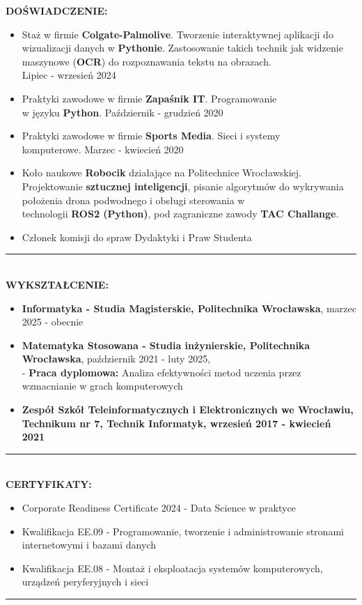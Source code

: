\documentclass[10pt]{article}
\begin{document}
\fontsize{14pt}{14pt}\selectfont \textbf{\color{Violet}DOŚWIADCZENIE:}
\fontsize{10pt}{10pt}\selectfont
\begin{itemize}[leftmargin=*]
    \item Staż w firmie \textbf{Colgate-Palmolive}. Tworzenie interaktywnej aplikacji do wizualizacji danych w \textbf{Pythonie}. Zastosowanie takich technik jak widzenie maszynowe (\textbf{OCR}) do rozpoznawania tekstu na obrazach. \\ Lipiec - wrzesień 2024
    \item Praktyki zawodowe w firmie \textbf{Zapaśnik IT}. Programowanie \\ w języku \textbf{Python}. Październik - grudzień 2020
    \item Praktyki zawodowe w firmie \textbf{Sports Media}. Sieci i systemy \\ komputerowe. Marzec - kwiecień 2020
    \item Koło naukowe \textbf{Robocik} działające na Politechnice Wrocławskiej. \\ Projektowanie \textbf{sztucznej inteligencji}, pisanie algorytmów do wykrywania położenia drona podwodnego i obsługi sterowania w \\ technologii \textbf{ROS2 (Python)}, pod zagraniczne zawody \textbf{TAC Challange}.
    \item Członek komisji do spraw Dydaktyki i Praw Studenta
\end{itemize}
\rule{17cm}{1pt} \\

\fontsize{14pt}{14pt}\selectfont \textbf{\color{Violet}WYKSZTAŁCENIE:}
\fontsize{10pt}{10pt}\selectfont
\begin{itemize}[leftmargin=*]
    \item \textbf{Informatyka - Studia Magisterskie, Politechnika Wrocławska}, marzec 2025 - obecnie
    \item \textbf{Matematyka Stosowana - Studia inżynierskie, Politechnika Wrocławska}, październik 2021 - luty 2025, \\
    - \textbf{Praca dyplomowa:} Analiza efektywności metod uczenia przez wzmacnianie w grach komputerowych
    \item \textbf{Zespół Szkół Teleinformatycznych i Elektronicznych we Wrocławiu, Technikum nr 7, Technik Informatyk, wrzesień 2017 - kwiecień 2021} 
\end{itemize}
\rule{17cm}{1pt} \\

\fontsize{14pt}{14pt}\selectfont \textbf{\color{Violet}CERTYFIKATY:}
\fontsize{10pt}{10pt}\selectfont
\begin{itemize}[leftmargin=*]
    \item Corporate Readiness Certificate 2024 - Data Science w praktyce
    \item Kwalifikacja EE.09 - Programowanie, tworzenie i administrowanie stronami internetowymi i bazami danych
    \item Kwalifikacja EE.08 - Montaż i eksploatacja systemów komputerowych, urządzeń peryferyjnych i sieci
\end{itemize}
\rule{17cm}{1pt} \\
\end{document}
